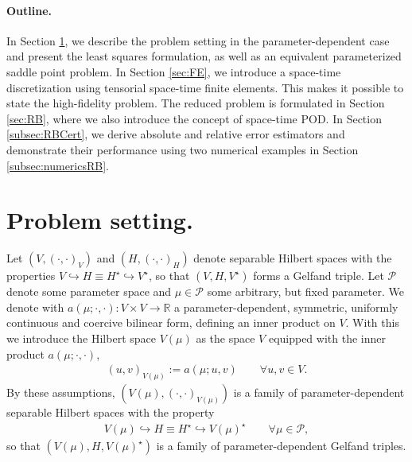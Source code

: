 \documentclass{article}
\theoremstyle{plain}
\theoremstyle{definition}
\theoremstyle{remark}
\newcommand{\RR}{\mathbb{R}}
\begin{document}
\paragraph*{Outline.} In Section \ref{sec:setting}, we describe the problem setting in the parameter-dependent case and present the least squares formulation, as well as an equivalent parameterized saddle point problem. In Section \ref{sec:FE}, we introduce a space-time discretization using tensorial space-time finite elements. This makes it possible to state the high-fidelity problem. The reduced problem is formulated in Section \ref{sec:RB}, where we also introduce the concept of space-time POD. In Section \ref{subsec:RBCert}, we derive absolute and relative error estimators and demonstrate their performance using two numerical examples in Section \ref{subsec:numericsRB}.


\section{Problem setting.}\label{sec:setting}
Let $(V,(\cdot,\cdot)_{V})$ and $(H,(\cdot,\cdot)_H)$ 
denote separable Hilbert spaces with the properties 
$V \hookrightarrow H\equiv H^\star \hookrightarrow V^\star$, so that $(V,H,V^\star)$ forms a Gelfand triple. Let $\mathcal{P}$ denote some parameter space and $\mu \in \mathcal{P}$ some arbitrary, but fixed parameter. We denote with $a(\mu; \cdot, \cdot) : V \times V \rightarrow \RR$ a parameter-dependent, symmetric, uniformly continuous and coercive bilinear form, defining an inner product on $V$. With this we introduce the Hilbert space $V(\mu)$ as the space $V$ equipped with the inner product $a(\mu; \cdot, \cdot)$,
\begin{align}\label{eq:RBbilinA}
    (u, v)_{V(\mu)} := a(\mu; u, v) \qquad \forall u, v \in V .
\end{align}
By these assumptions, $(V(\mu), (\cdot, \cdot)_{V(\mu)})$ is a family of parameter-dependent separable Hilbert spaces with the property
\begin{align}
    V(\mu) \hookrightarrow H \equiv H^\star \hookrightarrow V(\mu)^\star \qquad \forall \mu \in \mathcal{P},
\end{align}
so that $(V(\mu),H,V(\mu)^\star)$ is a family of parameter-dependent Gelfand triples.\\
\end{document}
